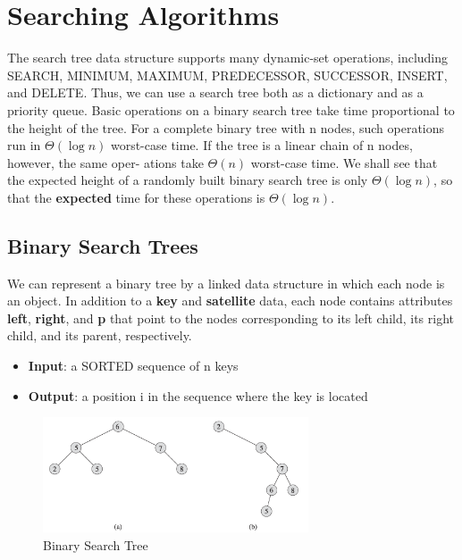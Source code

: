 \chapter{Searching Algorithms}

The search tree data structure supports many dynamic-set operations, including
SEARCH, MINIMUM, MAXIMUM, PREDECESSOR, SUCCESSOR, INSERT, and
DELETE. Thus, we can use a search tree both as a dictionary and as a priority
queue.
Basic operations on a binary search tree take time proportional to the height of
the tree. For a complete binary tree with n nodes, such operations run in $\Theta(\log n)$
worst-case time. If the tree is a linear chain of n nodes, however, the same oper-
ations take $\Theta(n)$ worst-case time. We shall see that the expected height of a randomly
built binary search tree is only $\Theta(\log n)$, so that the \textbf{expected} time for these 
operations is $\Theta(\log n)$.


\section{Binary Search Trees}

We can represent a binary tree by a linked data structure in which each node is an object.
In addition to a \textbf{key} and \textbf{satellite} data, each node contains attributes \textbf{left}, \textbf{right}, and \textbf{p} that
point to the nodes corresponding to its left child, its right child, and its parent, respectively.

\begin{itemize}
    \item \textbf{Input}: a SORTED sequence of n keys 
    \item \textbf{Output}: a position i in the sequence where the key is located
\end{itemize}

\begin{figure}[H]
    \centering
    \includegraphics[width=0.7\textwidth]{assets/binary_tree.png}
    \caption{Binary Search Tree}
\end{figure}

